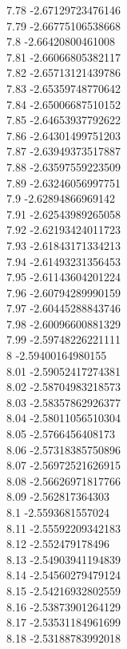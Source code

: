{7.78	-2.67129723476146\\
7.79	-2.66775106538668\\
7.8	-2.66420800461008\\
7.81	-2.66066805382117\\
7.82	-2.65713121439786\\
7.83	-2.65359748770642\\
7.84	-2.65006687510152\\
7.85	-2.64653937792622\\
7.86	-2.64301499751203\\
7.87	-2.63949373517887\\
7.88	-2.63597559223509\\
7.89	-2.63246056997751\\
7.9	-2.62894866969142\\
7.91	-2.62543989265058\\
7.92	-2.62193424011723\\
7.93	-2.61843171334213\\
7.94	-2.61493231356453\\
7.95	-2.61143604201224\\
7.96	-2.60794289990159\\
7.97	-2.60445288843746\\
7.98	-2.60096600881329\\
7.99	-2.59748226221111\\
8	-2.59400164980155\\
8.01	-2.59052417274381\\
8.02	-2.58704983218573\\
8.03	-2.58357862926377\\
8.04	-2.58011056510304\\
8.05	-2.5766456408173\\
8.06	-2.57318385750896\\
8.07	-2.56972521626915\\
8.08	-2.56626971817766\\
8.09	-2.562817364303\\
8.1	-2.5593681557024\\
8.11	-2.55592209342183\\
8.12	-2.552479178496\\
8.13	-2.54903941194839\\
8.14	-2.54560279479124\\
8.15	-2.54216932802559\\
8.16	-2.53873901264129\\
8.17	-2.53531184961699\\
8.18	-2.53188783992018\\
}
